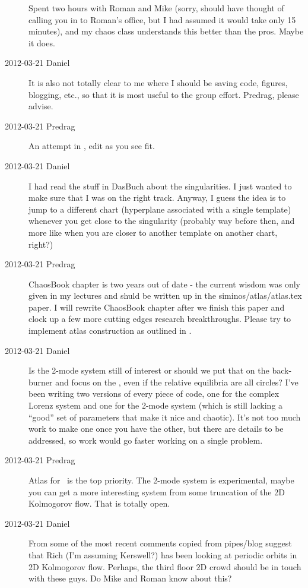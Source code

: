 \begin{description}
Spent two hours with Roman and Mike (sorry, should have thought of
calling you in to Roman's office, but I had assumed it would take only 15
minutes), and my chaos class understands this better than the pros. Maybe
it does.

\item[2012-03-21 Daniel]
It is also not totally clear to me where I should be saving code,
figures, blogging, etc., so that it is most useful to the group effort.
Predrag, please advise.

\item[2012-03-21 Predrag]
An attempt in , edit as you see fit.

\item[2012-03-21 Daniel]
I had read the stuff in DasBuch about the singularities. I just wanted to
make sure that I was on the right track. Anyway, I guess the idea is to
jump to a different chart (hyperplane associated with a single template)
whenever you get close to the singularity (probably way before then, and
more like when you are closer to another template on another chart,
right?)

\item[2012-03-21 Predrag]
ChaosBook chapter is two years out of date - the current wisdom was only
given in my lectures and shuld be written up in the
siminos/atlas/atlas.tex paper. I will rewrite ChaosBook chapter after we
finish this paper and clock up a few more cutting edges research
breakthroughs. Please try to implement atlas construction as outlined in
.

\item[2012-03-21 Daniel]
Is the 2-mode system still of interest or should we put that on the
back-burner and focus on the \cLe, even if the relative equilibria are
all circles? I've been writing two versions of every piece of code, one
for the complex Lorenz system and one for the 2-mode system (which is
still lacking a ``good'' set of parameters that make it nice and
chaotic). It's not too much work to make one once you have the other, but
there are details to be addressed, so work would go faster working on a
single problem.

\item[2012-03-21 Predrag]
Atlas for \cLe\ is the top priority. The 2-mode system is experimental,
maybe you can get a more interesting system from some truncation of the
2D Kolmogorov flow. That is totally open.

\item[2012-03-21 Daniel]
From some of the most recent comments copied from pipes/blog suggest that
Rich (I'm assuming Kerswell?) has been looking at periodic orbits in 2D
Kolmogorov flow. Perhaps, the third floor 2D crowd should be in touch
with these guys. Do Mike and Roman know about this?


\end{description}
